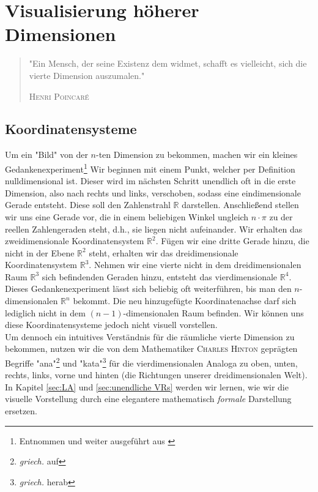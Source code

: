 \chapter{Visualisierung höherer Dimensionen}
\label{sec:Visualisierung}
\begin{quote}
"Ein Mensch, der seine Existenz dem widmet, schafft es vielleicht, sich die vierte Dimension auszumalen."
\begin{flushright}
\textsc{Henri Poincaré}
\end{flushright}
\end{quote}

\section{Koordinatensysteme}
\label{sec:KoS}
Um ein "Bild" von der $n$-ten Dimension zu bekommen, machen wir ein kleines Gedankenexperiment\footnote{Entnommen und weiter ausgeführt aus \cite[S. 71 f.]{Michio}} Wir beginnen mit einem Punkt, welcher per Definition nulldimensional ist. Dieser wird im nächsten Schritt unendlich oft in die erste Dimension, also nach rechts und links, verschoben, sodass eine eindimensionale Gerade entsteht. Diese soll den Zahlenstrahl $\mathbb{R}$ darstellen. Anschließend stellen wir uns eine Gerade vor, die in einem beliebigen Winkel ungleich $n\cdot\pi$ zu der reellen Zahlengeraden steht, d.h., sie liegen nicht aufeinander. Wir erhalten das zweidimensionale Koordinatensystem $\mathbb{R}^2$. Fügen wir eine dritte Gerade hinzu, die nicht in der Ebene $\mathbb{R}^2$ steht, erhalten wir das dreidimensionale Koordinatensystem $\mathbb{R}^3$. 
Nehmen wir eine vierte nicht in dem dreidimensionalen Raum $\mathbb{R}^3$ sich befindenden Geraden hinzu, entsteht das vierdimensionale $\mathbb{R}^4$. Dieses Gedankenexperiment lässt sich beliebig oft weiterführen, bis man den $n$-dimensionalen $\mathbb{R}^n$ bekommt. Die neu hinzugefügte Koordinatenachse darf sich lediglich nicht in dem $(n-1)$-dimensionalen Raum befinden. Wir können uns diese Koordinatensysteme jedoch nicht visuell vorstellen.
\\ \indent Um dennoch ein intuitives Verständnis für die räumliche vierte Dimension zu bekommen, nutzen wir die von dem Mathematiker \textsc{Charles Hinton} geprägten Begriffe "ana"\footnote{\textit{griech.} auf} und "kata"\footnote{\textit{griech.} herab} für die vierdimensionalen Analoga zu oben, unten, rechts, links, vorne und hinten (die Richtungen unserer dreidimensionalen Welt). In Kapitel \ref{sec:LA} und \ref{sec:unendliche VRs} werden wir lernen, wie wir die visuelle Vorstellung durch eine elegantere mathematisch \emph{formale} Darstellung ersetzen.


